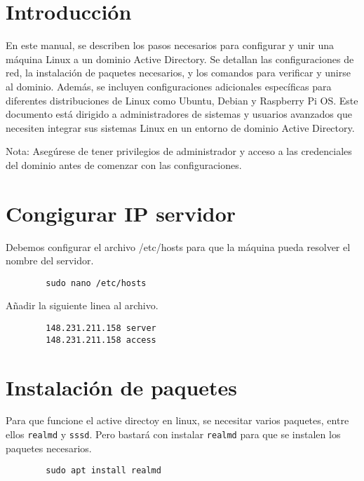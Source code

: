 \documentclass[11pt]{article}
\begin{document}
    


    \section{Introducción}

    En este manual, se describen los pasos necesarios para configurar y unir una máquina Linux a un dominio Active Directory. Se detallan las configuraciones de red, la instalación de paquetes necesarios, y los comandos para verificar y unirse al dominio. Además, se incluyen configuraciones adicionales específicas para diferentes distribuciones de Linux como Ubuntu, Debian y Raspberry Pi OS. Este documento está dirigido a administradores de sistemas y usuarios avanzados que necesiten integrar sus sistemas Linux en un entorno de dominio Active Directory.

    \begin{tcolorbox}[note]
        Nota: Asegúrese de tener privilegios de administrador y acceso a las credenciales del dominio antes de comenzar con las configuraciones.
    \end{tcolorbox}

    \section{Congigurar IP servidor}
    Debemos configurar el archivo /etc/hosts para que la máquina pueda resolver el nombre del servidor.
    \begin{lstlisting}
        sudo nano /etc/hosts
    \end{lstlisting}
    Añadir la siguiente linea al archivo.
    \begin{lstlisting}
        148.231.211.158 server
        148.231.211.158 access
    \end{lstlisting}



    \section{Instalación de paquetes}
    Para que funcione el active directoy en linux, se necesitar varios paquetes, entre ellos \texttt{realmd} y \texttt{sssd}.
    Pero bastará con instalar \texttt{realmd} para que se instalen los paquetes necesarios.

    \begin{lstlisting}
        sudo apt install realmd
    \end{lstlisting}
\end{document}

